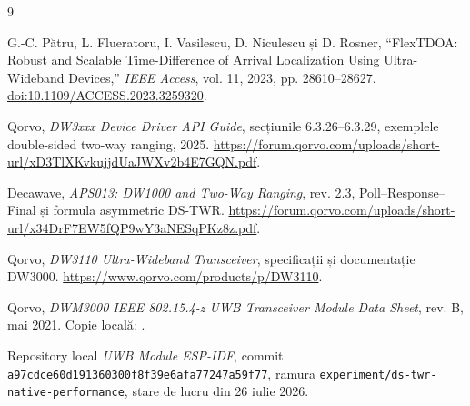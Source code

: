 \documentclass[11pt,a4paper]{article}
\begin{document}
\begin{thebibliography}{9}

G.-C. Pătru, L. Flueratoru, I. Vasilescu, D. Niculescu și D. Rosner,
``FlexTDOA: Robust and Scalable Time-Difference of Arrival Localization Using
Ultra-Wideband Devices,'' \emph{IEEE Access}, vol. 11, 2023,
pp. 28610--28627.
\href{https://doi.org/10.1109/ACCESS.2023.3259320}
{doi:10.1109/ACCESS.2023.3259320}.

Qorvo, \emph{DW3xxx Device Driver API Guide}, secțiunile 6.3.26--6.3.29,
exemplele double-sided two-way ranging, 2025.
\url{https://forum.qorvo.com/uploads/short-url/xD3TlXKvkujjdUaJWXv2b4E7GQN.pdf}.

Decawave, \emph{APS013: DW1000 and Two-Way Ranging}, rev. 2.3,
Poll--Response--Final și formula asymmetric DS-TWR.
\url{https://forum.qorvo.com/uploads/short-url/x34DrF7EW5fQP9wY3aNESqPKz8z.pdf}.

Qorvo, \emph{DW3110 Ultra-Wideband Transceiver}, specificații și documentație
DW3000.
\url{https://www.qorvo.com/products/p/DW3110}.

Qorvo, \emph{DWM3000 IEEE 802.15.4-z UWB Transceiver Module Data Sheet},
rev. B, mai 2021. Copie locală:
.

Repository local \emph{UWB Module ESP-IDF}, commit
\texttt{a97cdce60d191360300f8f39e6afa77247a59f77}, ramura
\texttt{experiment/ds-twr-native-performance}, stare de lucru din
26 iulie 2026.

\end{thebibliography}
\end{document}
